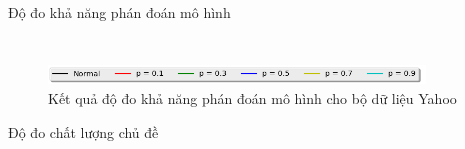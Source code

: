 \documentclass[pdf]{beamer}
\begin{document}
\begin{frame}{Độ đo khả năng phán đoán mô hình}
\begin{columns}[T]
\begin{column}{.50\textwidth}
\begin{figure}
			\end{figure}				
		\end{column} %
	\end{columns}
 \begin{figure}
	\begin{center}
		\captionsetup{justification=centering}
		\includegraphics[width=100mm]{menu.png}
		\caption{Kết quả độ đo khả năng phán đoán mô hình cho bộ dữ liệu Yahoo}
	\end{center}
\end{figure}
\end{frame}

\begin{frame}{Độ đo chất lượng chủ đề }
\begin{columns}[T] %
	\begin{column}{.50\textwidth}
		\begin{figure}
		\end{figure}
	\end{column} %
	\hfill%
	\begin{column}{.50\textwidth}
		\begin{figure}

\end{figure}
\end{column}
\end{columns}
\end{frame}
\end{document}
